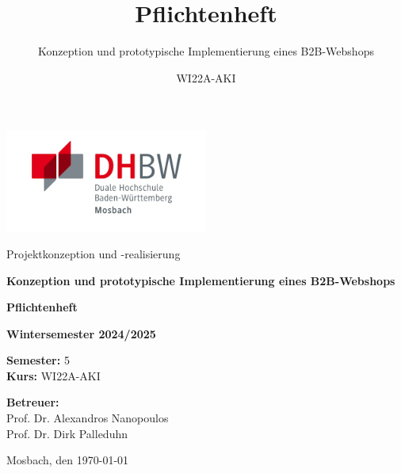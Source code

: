 \documentclass[%
	12pt,
	a4paper,
	oneside,
	parskip=full
]{scrbook}
\title{Pflichtenheft}
\subtitle{Konzeption und prototypische Implementierung eines B2B-Webshops}
\author{WI22A-AKI}
\begin{document}

\begin{titlepage}
	\centering
	\includegraphics[width=0.5\textwidth]{Media/dhbwlogo.png}\vspace{1cm}

	{\large Projektkonzeption und -realisierung\par}
	\vspace{0.5cm}
	{\Large\bfseries Konzeption und prototypische Implementierung eines B2B-Webshops\par}
	\vspace{1.5cm}

	{\Huge \textbf{Pflichtenheft}\par}
	\vspace{2cm}

	\doublespacing
	{\large \textbf{Wintersemester 2024/2025}\par}
	\textbf{Semester:} 5\\
	\textbf{Kurs:} WI22A-AKI

	{\large\textbf{Betreuer:}\\}
	{\large Prof. Dr. Alexandros Nanopoulos} \\
	{\large Prof. Dr. Dirk Palleduhn}

	\vfill

	Mosbach, den \today  %

\end{titlepage}
\end{document}
